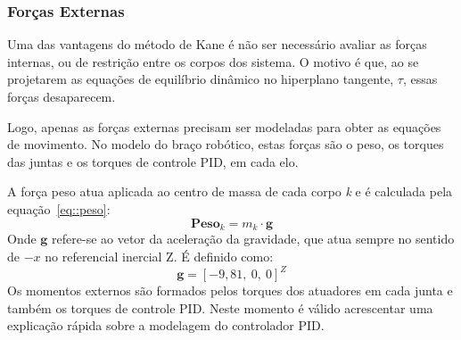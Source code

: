 
\bigskip {}

\medskip {}

\medskip {}

\medskip {}


\subsubsection{Forças Externas}

Uma das vantagens do método de Kane é não ser necessário avaliar as forças
internas, ou de restrição entre os corpos dos sistema. O motivo é que, ao se
projetarem as equações de equilíbrio dinâmico no hiperplano tangente, $\tau$,
essas forças desaparecem.

Logo, apenas as forças externas precisam ser modeladas para obter as equações de
movimento. No modelo do braço robótico, estas forças são o peso, os torques das
juntas e os torques de controle PID, em cada elo.

A força peso atua aplicada ao centro de massa de cada corpo \textit{k} e é calculada
pela equação~\ref{eq::peso}:
%
\begin{equation}
	\mathbf{Peso}_{k} = m_{k} \cdot \mathbf{g} \label{eq::peso}
\end{equation}
%
Onde $\mathbf{g}$ refere-se ao vetor da aceleração da gravidade, que atua sempre
no sentido de $-x$ no referencial inercial Z. É definido como:
%
\begin{equation}
	\mathbf{g} = [-9,81,~0,~0]^{Z}
\end{equation}
%
Os momentos externos são formados pelos torques dos atuadores em cada junta e
também os torques de controle PID. Neste momento é válido acrescentar uma
explicação rápida sobre a modelagem do controlador PID.

